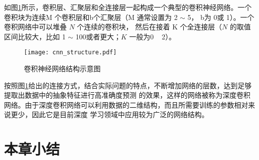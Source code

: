 如图\ref{cnn_structure}所示，卷积层、汇聚层和全连接层一起构成一个典型的卷积神经网络。一个卷积块为连续M 个卷积层和b个汇聚层（M
通常设置为 2 $\sim$ 5， b为 0或 1）。一个卷积网络中可以堆叠 $N$ 个连续的卷积块，
然后在接着 K 个全连接层（$N$ 的取值区间比较大，比如 1 $\sim$ 100或者更大；$K$
一般为0 ~ 2）。
\begin{figure}[h]
	\texttt{[image: cnn\_structure.pdf]}
	\caption{卷积神经网络结构示意图}
	\label{cnn_structure}
\end{figure}

按照图\ref{cnn_structure}给出的连接方式，结合实际问题的特点，不断增加网络的层数，达到足够提取出数据中的抽象特征进行高准确度预测
的效果，这样的网络被称为深度卷积网络。由于深度卷积网络可以利用数据的二维结构，而且所需要训练的参数相对来说更少，因此它是目前深度
学习领域中应用较为广泛的网络结构。

\section{本章小结}

